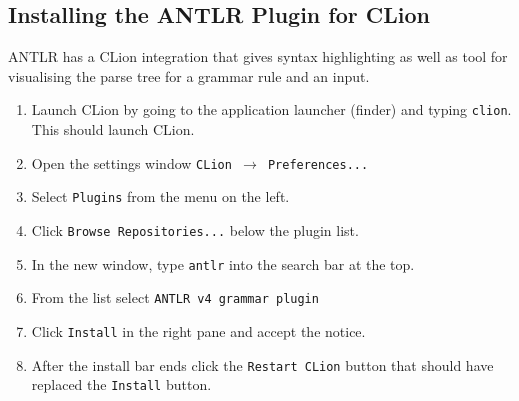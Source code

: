 \documentclass[../setup.tex]{subfiles}
\begin{document}
\subsection{Installing the ANTLR Plugin for CLion}
ANTLR has a CLion integration that gives syntax highlighting as well as tool for visualising the
parse tree for a grammar rule and an input.
\begin{enumerate}
  \item
    Launch CLion by going to the application launcher (finder) and typing \lstinline{clion}. This
    should launch CLion.
  \item
    Open the settings window \texttt{CLion $\rightarrow$ Preferences...}
  \item
    Select \texttt{Plugins} from the menu on the left.
  \item
    Click \texttt{Browse Repositories...} below the plugin list.
  \item
    In the new window, type \texttt{antlr} into the search bar at the top.
  \item
    From the list select \lstinline{ANTLR v4 grammar plugin}
  \item
    Click \texttt{Install} in the right pane and accept the notice.
  \item
    After the install bar ends click the \texttt{Restart CLion} button that should have replaced
    the \texttt{Install} button.
\end{enumerate}
\end{document}
